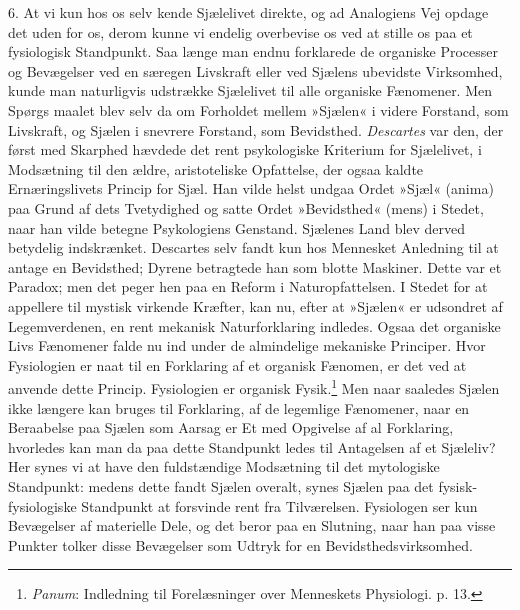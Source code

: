 \documentclass[12pt,a4paper,openany]{book}
\newcommand{\opage}[1]{\marginnote{\footnotesize\textit{[#1]}}}
\begin{document}
6. At vi kun hos os selv kende Sjælelivet direkte, og ad Analogiens Vej
opdage det uden for os, derom kunne vi endelig overbevise os ved at
stille os paa et fysiologisk Standpunkt. Saa længe man endnu forklarede
de organiske Processer og Bevægelser ved en særegen Livskraft eller ved
Sjælens ubevidste Virksomhed, kunde man naturligvis udstrække Sjælelivet
til alle organiske Fænomener. Men Spørgs%
\opage{11}maalet blev selv da om Forholdet mellem »Sjælen« i videre
Forstand, som Livskraft, og Sjælen i snevrere Forstand, som Bevidsthed.
\emph{Descartes} var den, der først med Skarphed hævdede det rent
psykologiske Kriterium for Sjælelivet, i Modsætning til den ældre,
aristoteliske Opfattelse, der ogsaa kaldte Ernæringslivets Princip for
Sjæl. Han vilde helst undgaa Ordet »Sjæl« (anima) paa Grund af dets
Tvetydighed og satte Ordet »Bevidsthed« (mens) i Stedet, naar han vilde
betegne Psykologiens Genstand. Sjælenes Land blev derved betydelig
indskrænket. Descartes selv fandt kun hos Mennesket Anledning til at
antage en Bevidsthed; Dyrene betragtede han som blotte Maskiner. Dette
var et Paradox; men det peger hen paa en Reform i Naturopfattelsen. I
Stedet for at appellere til mystisk virkende Kræfter, kan nu, efter at
»Sjælen« er udsondret af Legemverdenen, en rent mekanisk Naturforklaring
indledes. Ogsaa det organiske Livs Fænomener falde nu ind under de
almindelige mekaniske Principer. Hvor Fysiologien er naat til en
Forklaring af et organisk Fænomen, er det ved at anvende dette Princip.
Fysiologien er organisk Fysik.\footnote[1]{\emph{Panum}: Indledning til
Forelæsninger over Menneskets Physiologi. p. 13.} Men naar saaledes
Sjælen ikke længere kan bruges til Forklaring, af de legemlige
Fænomener, naar en Beraabelse paa Sjælen som Aarsag er Et med Opgivelse
af al Forklaring, hvorledes kan man da paa dette Standpunkt ledes til
Antagelsen af et Sjæleliv? Her synes vi at have den fuldstændige
Modsætning til det mytologiske Standpunkt: medens dette fandt Sjælen
overalt, synes Sjælen paa det fysisk-fysiologiske Standpunkt at
forsvinde rent fra Tilværelsen. Fysiologen ser kun Bevægelser af
materielle Dele, og det beror paa en Slutning, naar han paa visse
Punkter tolker disse Bevægelser som Udtryk for en Bevidsthedsvirksomhed.
\end{document}
